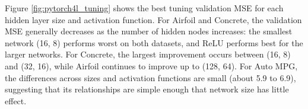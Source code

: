 \documentclass{article}
\begin{document}
Figure \ref{fig:pytorch4l_tuning} shows the best tuning validation MSE for each hidden layer size and activation function. For Airfoil and Concrete, the validation MSE generally decreases as the number of hidden nodes increases: the smallest network (16, 8) performs worst on both datasets, and ReLU performs best for the larger networks. For Concrete, the largest improvement occurs between (16, 8) and (32, 16), while Airfoil continues to improve up to (128, 64). For Auto MPG, the differences across sizes and activation functions are small (about 5.9 to 6.9), suggesting that its relationships are simple enough that network size has little effect.
\medskip
\begin{table}[H]
    \centering
    \caption{PyTorch 4L Neural Network Quality of Fit Results}
    \label{tab:pytorch4l_qof}
    \small
\end{table}
\end{document}
